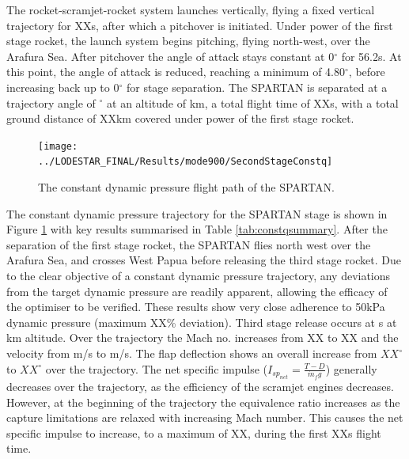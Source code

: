 The rocket-scramjet-rocket system launches vertically, flying a fixed vertical trajectory for XXs, after which a pitchover is initiated. Under power of the first stage rocket, the launch system begins pitching, flying north-west, over the Arafura Sea. 
After pitchover the angle of attack stays constant at 0$^\circ$ for 56.2s. At this point, the angle of attack is reduced, reaching a minimum of 4.80$^\circ$, before increasing back up to 0$^\circ$ for stage separation. 
The SPARTAN is separated at a trajectory angle of \firstsecondSeparationgammaConstq$^\circ$ at an altitude of \firstsecondSeparationAltConstq km, a total flight time of XXs, with a total ground distance of XXkm covered under power of the first stage rocket. 




\begin{figure}[ht!]
\centering
\texttt{[image: ../LODESTAR\_FINAL/Results/mode900/SecondStageConstq]}
\caption{The constant dynamic pressure flight path of the SPARTAN.}
\label{fig:SecondStageConstq}
\end{figure}


The constant dynamic pressure trajectory for the SPARTAN stage is shown in Figure \ref{fig:SecondStageConstq} with key results summarised in Table \ref{tab:constqsummary}. After the separation of the first stage rocket, the SPARTAN flies north west over the Arafura Sea, and crosses West Papua before releasing the third stage rocket. Due to the clear objective of a constant dynamic pressure trajectory, any deviations from the target dynamic pressure are readily apparent, allowing the efficacy of the optimiser to be verified. 
These results show very close adherence to 50kPa dynamic pressure (maximum XX\% deviation). Third stage release occurs at \secondFlightTimeConstq s at \secondthirdSeparationAltConstq km altitude. 
Over the trajectory the Mach no. increases from XX to XX and the velocity from \firstsecondSeparationvConstq m/s to \secondthirdSeparationvConstq m/s. The flap deflection shows an overall increase from $XX^\circ$ to $XX^\circ$ over the trajectory.  The net specific impulse ($I_{sp_{net}} = \frac{T-D}{\dot{m}_f g}$) generally decreases over the trajectory, as the efficiency of the scramjet engines decreases. However, at the beginning of the trajectory the equivalence ratio increases as the capture limitations are relaxed with increasing Mach number. This causes the net specific impulse to increase, to a maximum of XX, during the first XXs flight time. 





